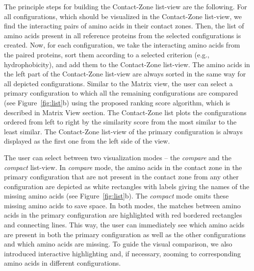 \documentclass{bmcart}
\def\MatView {Matrix view\xspace}
\def\CoZoListView {Contact-Zone list-view\xspace}
\def\CoZoList{Contact-Zone list\xspace}
\begin{document}
The principle steps for building the \CoZoListView are the following.
For all configurations, which should be visualized in the \CoZoListView, we find the interacting pairs of amino acids in their contact zones.
Then, the list of amino acids present in all reference proteins from the selected configurations is created.
Now, for each configuration, we take the interacting amino acids from the paired proteins, sort them according to a selected criterion (e.g., hydrophobicity), and add them to the \CoZoListView.
The amino acids in the left part of the \CoZoListView are always sorted in the same way for all depicted configurations.
Similar to the \MatView, the user can select a primary configuration to which all the remaining configurations are compared (see Figure~\ref{fig:list}b) using the proposed ranking score algorithm, which is described in Matrix View section.
The \CoZoList plots the configurations ordered from left to right by the similarity score from the most similar to the least similar.
The \CoZoListView of the primary configuration is always displayed as the first one from the left side of the view.

The user can select between two visualization modes -- the \textit{compare} and the \textit{compact} list-view.
In \textit{compare} mode, the amino acids in the contact zone in the primary configuration that are not present in the contact zone from any other configuration are depicted as white rectangles with labels giving the names of the missing amino acids (see Figure~\ref{fig:list}b).
The \textit{compact} mode omits these missing amino acids to save space.
In both modes, the matches between amino acids in the primary configuration are highlighted with red bordered rectangles and connecting lines.
This way, the user can immediately see which amino acids are present in both the primary configuration as well as the other configurations and which amino acids are missing.
To guide the visual comparison, we also introduced interactive highlighting and, if necessary, zooming to corresponding amino acids in different configurations.

\end{document}
